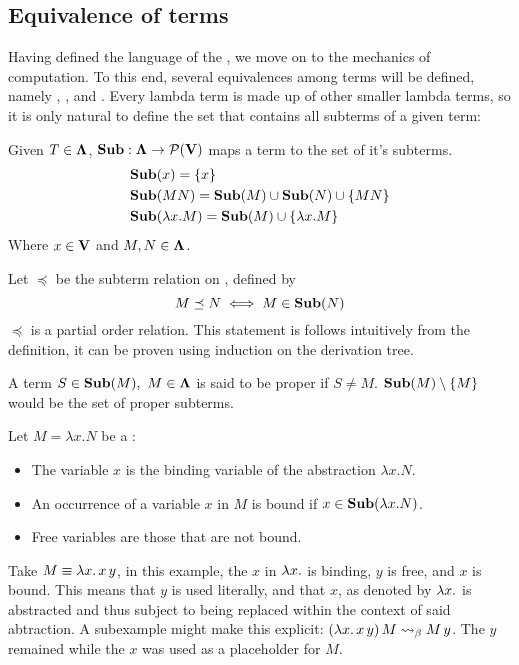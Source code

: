 \subsection{\centering Equivalence of terms}
Having defined the language of the \lcalc, we move on to the mechanics of computation. To this end, several equivalences among terms will be defined, namely \aequiv, \bequiv, and \etaequiv
. Every lambda term is made up of other smaller lambda terms, so it is only natural to define the set that contains all subterms of a given term:
\begin{definition} Given $T \in \mathbf{\Lambda}$, $\mathbf{Sub} : \mathbf{\Lambda} \to \mathcal{P}(\mathbf{V})$ maps a term to the set of it's subterms.
  \begin{align*}
    &\mathbf{Sub}(x) = \{x\} \\
    &\mathbf{Sub}(MN) = \mathbf{Sub}(M)  \cup \mathbf{Sub}(N) \cup \{MN\} \\
    &\mathbf{Sub}(\lambda x . M) = \mathbf{Sub}(M)  \cup \{\lambda x. M\}
  \end{align*}
  Where $x \in \mathbf{V}$ and $M, N \in \mathbf{\Lambda} $.

\end{definition}
\begin{remark}
  Let \( \preceq \) be the subterm relation on \lterms, defined by
  \[
    M \preceq N \iff M \in \mathbf{Sub}( N )
  \]
  \( \preceq \) is a partial order relation. This statement is follows intuitively from the definition, it can be proven using induction on the derivation tree.
\end{remark}
\begin{definition} A term $ S \in \mathbf{Sub}(M), \ M \in \mathbf{\Lambda}$ is said to be proper if $S \neq M$. $\mathbf{Sub}(M) \setminus \{M\}$ would be the set of proper subterms.
\end{definition}
\begin{definition} Let \( M = \lambda x. N \) be a \lterm:
  \begin{itemize}
  \item The variable \( x \) is the binding variable of the abstraction \( \lambda x. N \).
  \item An occurrence of a variable \( x \) in \( M \) is bound if \( x \in \mathbf{Sub}( \lambda x. N ) \).
  \item Free variables are those that are not bound.
  \end{itemize}
\end{definition}
\begin{example}
  Take $ M \equiv \lambda x . \, x \, y $, in this example, the $x$ in $\lambda x. $ is binding, $y$ is free, and $x$ is bound. This means that $y$ is used literally, and that $x$, as denoted by $\lambda x.$ is abstracted and thus subject to being replaced within the context of said abtraction. A subexample might make this explicit: $ (\lambda x . \, x \, y) \, M \mathrel{\leadsto}_\beta M \, y $. The $y$ remained while the $x$ was used as a placeholder for $M$.
\end{example}
